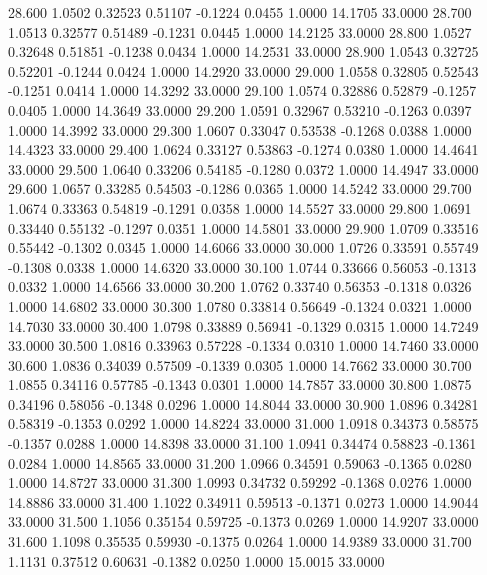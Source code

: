   28.600   1.0502   0.32523   0.51107  -0.1224   0.0455   1.0000  14.1705  33.0000
  28.700   1.0513   0.32577   0.51489  -0.1231   0.0445   1.0000  14.2125  33.0000
  28.800   1.0527   0.32648   0.51851  -0.1238   0.0434   1.0000  14.2531  33.0000
  28.900   1.0543   0.32725   0.52201  -0.1244   0.0424   1.0000  14.2920  33.0000
  29.000   1.0558   0.32805   0.52543  -0.1251   0.0414   1.0000  14.3292  33.0000
  29.100   1.0574   0.32886   0.52879  -0.1257   0.0405   1.0000  14.3649  33.0000
  29.200   1.0591   0.32967   0.53210  -0.1263   0.0397   1.0000  14.3992  33.0000
  29.300   1.0607   0.33047   0.53538  -0.1268   0.0388   1.0000  14.4323  33.0000
  29.400   1.0624   0.33127   0.53863  -0.1274   0.0380   1.0000  14.4641  33.0000
  29.500   1.0640   0.33206   0.54185  -0.1280   0.0372   1.0000  14.4947  33.0000
  29.600   1.0657   0.33285   0.54503  -0.1286   0.0365   1.0000  14.5242  33.0000
  29.700   1.0674   0.33363   0.54819  -0.1291   0.0358   1.0000  14.5527  33.0000
  29.800   1.0691   0.33440   0.55132  -0.1297   0.0351   1.0000  14.5801  33.0000
  29.900   1.0709   0.33516   0.55442  -0.1302   0.0345   1.0000  14.6066  33.0000
  30.000   1.0726   0.33591   0.55749  -0.1308   0.0338   1.0000  14.6320  33.0000
  30.100   1.0744   0.33666   0.56053  -0.1313   0.0332   1.0000  14.6566  33.0000
  30.200   1.0762   0.33740   0.56353  -0.1318   0.0326   1.0000  14.6802  33.0000
  30.300   1.0780   0.33814   0.56649  -0.1324   0.0321   1.0000  14.7030  33.0000
  30.400   1.0798   0.33889   0.56941  -0.1329   0.0315   1.0000  14.7249  33.0000
  30.500   1.0816   0.33963   0.57228  -0.1334   0.0310   1.0000  14.7460  33.0000
  30.600   1.0836   0.34039   0.57509  -0.1339   0.0305   1.0000  14.7662  33.0000
  30.700   1.0855   0.34116   0.57785  -0.1343   0.0301   1.0000  14.7857  33.0000
  30.800   1.0875   0.34196   0.58056  -0.1348   0.0296   1.0000  14.8044  33.0000
  30.900   1.0896   0.34281   0.58319  -0.1353   0.0292   1.0000  14.8224  33.0000
  31.000   1.0918   0.34373   0.58575  -0.1357   0.0288   1.0000  14.8398  33.0000
  31.100   1.0941   0.34474   0.58823  -0.1361   0.0284   1.0000  14.8565  33.0000
  31.200   1.0966   0.34591   0.59063  -0.1365   0.0280   1.0000  14.8727  33.0000
  31.300   1.0993   0.34732   0.59292  -0.1368   0.0276   1.0000  14.8886  33.0000
  31.400   1.1022   0.34911   0.59513  -0.1371   0.0273   1.0000  14.9044  33.0000
  31.500   1.1056   0.35154   0.59725  -0.1373   0.0269   1.0000  14.9207  33.0000
  31.600   1.1098   0.35535   0.59930  -0.1375   0.0264   1.0000  14.9389  33.0000
  31.700   1.1131   0.37512   0.60631  -0.1382   0.0250   1.0000  15.0015  33.0000
